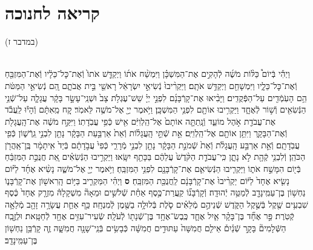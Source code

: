 \documentclass[twoside, openany, parskip=half, 11pt]{book}
\begin{document}
\begin{sometimes}
\begin{footnotesize}
\begin{multicols}{2}
\end{multicols}


\newcommand{\tsource}[1]{\begin{scriptsize} \textsf{(#1)} \end{scriptsize}}
\section[חנוכה]{קריאה לחנוכה}

\begin{multicols}{2}
\tsource{במדבר ז}\\
וַיְהִ֡י בְּֿיוֹם֩ כַּלּ֨וֹת מֹשֶׁ֜ה לְֿהָקִ֣ים אֶת־הַמִּשְׁכָּ֗ן וַיִּמְשַׁ֨ח אֹת֜וֹ וַיְקַדֵּ֤שׁ אֹתוֹ֙ וְֿאֶת־כׇּל־כֵּלָ֔יו וְֿאֶת־הַמִּזְבֵּ֖חַ וְֿאֶת־כׇּל־כֵּלָ֑יו וַיִּמְשָׁחֵ֖ם וַיְקַדֵּ֥שׁ אֹתָֽם׃ וַיַּקְרִ֨יבוּ֙ נְֿשִׂיאֵ֣י יִשְׂרָאֵ֔ל רָאשֵׁ֖י בֵּ֣ית אֲבֹתָ֑ם הֵ֚ם נְֿשִׂיאֵ֣י הַמַּטֹּ֔ת הֵ֥ם הָעֹֽמְֿדִ֖ים עַל־הַפְּֿקֻדִֽים׃ וַיָּבִ֨יאוּ אֶת־קָרְֿבָּנָ֜ם לִפְנֵ֣י יְיָ֗ שֵׁשׁ־עֶגְלֹ֥ת צָב֙ וּשְׁנֵֽי־עָשָׂ֣ר בָּקָ֔ר עֲגָלָ֛ה עַל־שְֿׁנֵ֥י הַנְּֿשִׂאִ֖ים וְֿשׁ֣וֹר לְֿאֶחָ֑ד וַיַּקְרִ֥יבוּ אוֹתָ֖ם לִפְנֵ֥י הַמִּשְׁכָּֽן׃ 
וַיֹּ֥אמֶר יְיָ֖ אֶל־מֹשֶׁ֥ה לֵּאמֹֽר׃ קַ֚ח מֵֽאִתָּ֔ם וְֿהָי֕וּ לַֽעֲבֹ֕ד אֶת־עֲבֹדַ֖ת אֹ֣הֶל מוֹעֵ֑ד וְֿנָֽתַתָּ֤ה אוֹתָם֙ אֶל־הַֽלְוִיִּ֔ם אִ֖ישׁ כְּֿפִ֥י עֲבֹֽדָתֽוֹ׃ וַיִּקַּ֣ח מֹשֶׁ֔ה אֶת־הָֽעֲגָלֹ֖ת וְֿאֶת־הַבָּקָ֑ר וַיִּתֵּ֥ן אוֹתָ֖ם אֶל־הַֽלְוִיִּֽם׃ אֵ֣ת שְֿׁתֵּ֣י הָֽעֲגָל֗וֹת וְֿאֵת֙ אַרְבַּ֣עַת הַבָּקָ֔ר נָתַ֖ן לִבְנֵ֣י גֵֽרְֿשׁ֑וֹן כְּֿפִ֖י עֲבֹֽדָתָֽם׃ וְֿאֵ֣ת אַרְבַּ֣ע הָֽעֲגָלֹ֗ת וְֿאֵת֙ שְֿׁמֹנַ֣ת הַבָּקָ֔ר נָתַ֖ן לִבְנֵ֣י מְֿרָרִ֑י כְּֿפִי֙ עֲבֹ֣דָתָ֔ם בְּֿיַד֙ אִֽיתָמָ֔ר בֶּֽן־אַֽהֲרֹ֖ן הַכֹּהֵֽן׃ וְֿלִבְנֵ֥י קְֿהָ֖ת לֹ֣א נָתָ֑ן כִּֽי־עֲבֹדַ֤ת הַקֹּ֨דֶשׁ֙ עֲלֵהֶ֔ם בַּכָּתֵ֖ף יִשָּֽׂאוּ׃ וַיַּקְרִ֣יבוּ הַנְּֿשִׂאִ֗ים אֵ֚ת חֲנֻכַּ֣ת הַמִּזְבֵּ֔חַ בְּֿי֖וֹם הִמָּשַׁ֣ח אֹת֑וֹ וַיַּקְרִ֧יבוּ הַנְּֿשִׂיאִ֛ם אֶת־קָרְֿבָּנָ֖ם לִפְנֵ֥י הַמִּזְבֵּֽחַ׃ וַיֹּ֥אמֶר יְיָ֖ אֶל־מֹשֶׁ֑ה נָשִׂ֨יא אֶחָ֜ד לַיּ֗וֹם נָשִׂ֤יא אֶחָד֙ לַיּ֔וֹם יַקְרִ֨יבוּ֙ אֶת־קָרְֿבָּנָ֔ם לַֽחֲנֻכַּ֖ת הַמִּזְבֵּֽחַ׃ \textbf{ס}  
וַיְהִ֗י הַמַּקְרִ֛יב בַּיּ֥וֹם הָֽרִאשׁ֖וֹן אֶת־קָרְֿבָּנ֑וֹ נַחְשׁ֥וֹן בֶּן־עַמִּֽינָדָ֖ב לְֿמַטֵּ֥ה יְֿהוּדָֽה׃ וְֿקָרְֿבָּנ֞וֹ קַֽעֲרַת־כֶּ֣סֶף אַחַ֗ת שְֿׁלֹשִׁ֣ים וּמֵאָה֘ מִשְׁקָלָהּ֒ מִזְרָ֤ק אֶחָד֙ כֶּ֔סֶף שִׁבְעִ֥ים שֶׁ֖קֶל בְּֿשֶׁ֣קֶל הַקֹּ֑דֶשׁ שְֿׁנֵיהֶ֣ם מְֿלֵאִ֗ים סֹ֛לֶת בְּֿלוּלָ֥ה בַשֶּׁ֖מֶן לְֿמִנְחָֽה׃ כַּ֥ף אַחַ֛ת עֲשָׂרָ֥ה זָהָ֖ב מְֿלֵאָ֥ה קְֿטֹֽרֶת׃
פַּ֣ר אֶחָ֞ד בֶּן־בָּקָ֗ר אַ֧יִל אֶחָ֛ד כֶּֽבֶשׂ־אֶחָ֥ד בֶּן־שְֿׁנָת֖וֹ לְֿעֹלָֽה׃ שְֿׂעִיר־עִזִּ֥ים אֶחָ֖ד לְֿחַטָּֽאת׃ וּלְזֶ֣בַֽח הַשְּֿׁלָמִים֘ בָּקָ֣ר שְֿׁנַ֒יִם֒ אֵילִ֤ם חֲמִשָּׁה֙ עַתּוּדִ֣ים חֲמִשָּׁ֔ה כְּֿבָשִׂ֥ים בְּֿנֵֽי־שָׁנָ֖ה חֲמִשָּׁ֑ה זֶ֛ה קָרְֿבַּ֥ן נַחְשׁ֖וֹן בֶּן־עַמִּֽינָדָֽב׃


\end{multicols}
\end{footnotesize}
\end{sometimes}
\end{document}

